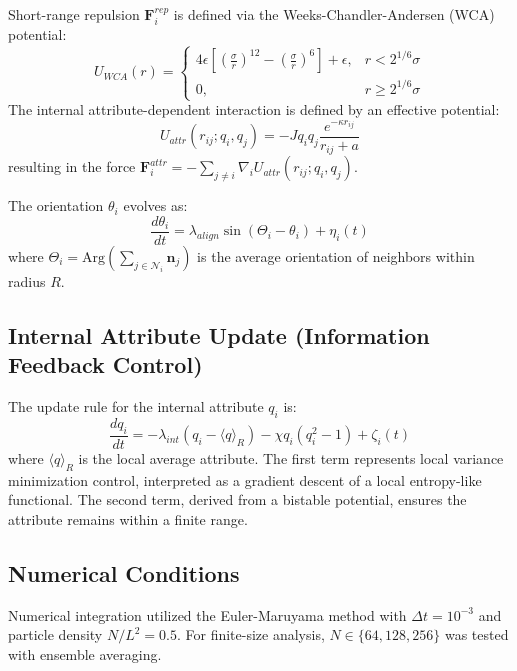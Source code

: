\documentclass[12pt]{article}
\begin{document}
Short-range repulsion $\mathbf{F}_i^{rep}$ is defined via the Weeks-Chandler-Andersen (WCA) potential\cite{5}:
\begin{equation}
U_{WCA}(r) = 
\begin{cases} 
4\epsilon \left[ \left(\frac{\sigma}{r}\right)^{12} - \left(\frac{\sigma}{r}\right)^6 \right] + \epsilon, & r < 2^{1/6}\sigma \\
0, & r \ge 2^{1/6}\sigma
\end{cases}
\end{equation}
The internal attribute-dependent interaction is defined by an effective potential:
\begin{equation}
U_{attr}(r_{ij}; q_i, q_j) = -J q_i q_j \frac{e^{-\kappa r_{ij}}}{r_{ij} + a}
\end{equation}
resulting in the force $\mathbf{F}_i^{attr} = -\sum_{j \neq i} \nabla_i U_{attr}(r_{ij}; q_i, q_j)$.

The orientation $\theta_i$ evolves as:
\begin{equation}
\frac{d\theta_i}{dt} = \lambda_{align} \sin(\Theta_i - \theta_i) + \eta_i(t)
\end{equation}
where $\Theta_i = \text{Arg}(\sum_{j \in \mathcal{N}_i} \mathbf{n}_j)$ is the average orientation of neighbors within radius $R$.

\subsection{Internal Attribute Update (Information Feedback Control)}
The update rule for the internal attribute $q_i$ is:
\begin{equation}
\frac{dq_i}{dt} = -\lambda_{int}(q_i - \langle q \rangle_R) - \chi q_i (q_i^2 - 1) + \zeta_i(t)
\end{equation}
where $\langle q \rangle_R$ is the local average attribute. The first term represents local variance minimization control, interpreted as a gradient descent of a local entropy-like functional. The second term, derived from a bistable potential, ensures the attribute remains within a finite range.

\subsection{Numerical Conditions}
Numerical integration utilized the Euler-Maruyama method\cite{6} with $\Delta t = 10^{-3}$ and particle density $N/L^2 = 0.5$. For finite-size analysis, $N \in \{64, 128, 256\}$ was tested with ensemble averaging.
\end{document}
